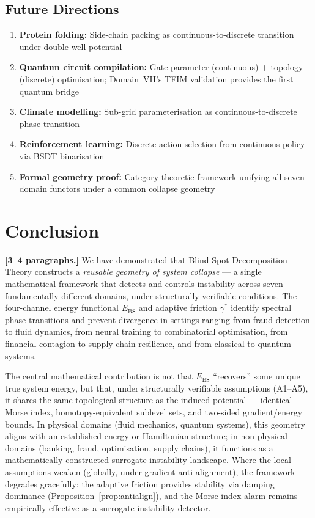 \documentclass[11pt,a4paper]{article}
\newcommand{\Ebs}{E_{\mathrm{BS}}}
\begin{document}
\subsection{Future Directions}
\begin{enumerate}[nosep]
  \item \textbf{Protein folding:} Side-chain packing as continuous-to-discrete
        transition under double-well potential
  \item \textbf{Quantum circuit compilation:} Gate parameter (continuous) +
        topology (discrete) optimisation; Domain~VII's TFIM validation
        provides the first quantum bridge
  \item \textbf{Climate modelling:} Sub-grid parameterisation as
        continuous-to-discrete phase transition
  \item \textbf{Reinforcement learning:} Discrete action selection from
        continuous policy via BSDT binarisation
  \item \textbf{Formal geometry proof:} Category-theoretic framework
        unifying all seven domain functors under a common collapse
        geometry
\end{enumerate}


\section{Conclusion}\label{sec:conclusion}

\textbf{[3--4 paragraphs.]}
We have demonstrated that Blind-Spot Decomposition Theory constructs
a \emph{reusable geometry of system collapse} --- a single
mathematical framework that detects and controls instability across
seven fundamentally different domains, under structurally verifiable
conditions.  The four-channel energy functional $\Ebs$ and adaptive
friction $\gamma^*$ identify spectral phase transitions and prevent
divergence in settings ranging from fraud detection to fluid dynamics,
from neural training to combinatorial optimisation, from financial
contagion to supply chain resilience, and from classical to quantum
systems.

The central mathematical contribution is not that $\Ebs$ ``recovers''
some unique true system energy, but that, under structurally verifiable
assumptions (A1--A5), it shares the same topological structure as the
induced potential --- identical Morse index, homotopy-equivalent sublevel
sets, and two-sided gradient/energy bounds.  In physical domains
(fluid mechanics, quantum systems), this geometry aligns with an
established energy or Hamiltonian structure; in non-physical domains
(banking, fraud, optimisation, supply chains), it functions as a
mathematically constructed surrogate instability landscape.
Where the local assumptions weaken (globally, under gradient
anti-alignment), the framework degrades gracefully: the adaptive
friction provides stability via damping dominance
(Proposition~\ref{prop:antialign}), and the Morse-index alarm remains
empirically effective as a surrogate instability detector.
\end{document}

